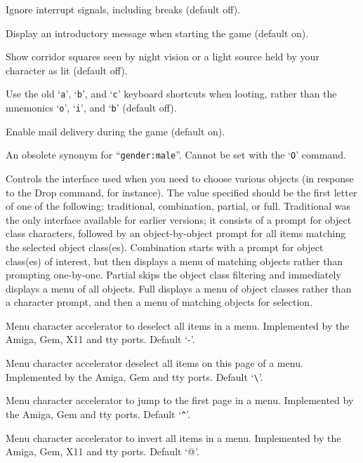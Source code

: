 \item[\ib{ignintr}]
Ignore interrupt signals, including breaks (default off).
\item[\ib{legacy}]
Display an introductory message when starting the game (default on).
\item[\ib{lit\_corridor}]
Show corridor squares seen by night vision or a light source held by your
character as lit (default off).
\item[\ib{lootabc}]
Use the old `{\tt a}', `{\tt b}', and `{\tt c}' keyboard shortcuts when
looting, rather than the mnemonics `{\tt o}', `{\tt i}', and `{\tt b}' (default off).
\item[\ib{mail}]
Enable mail delivery during the game (default on).
\item[\ib{male}]
An obsolete synonym for ``{\tt gender:male}''.  Cannot be set with the
`{\tt O}' command.
\item[\ib{menustyle}]
Controls the interface used when you need to choose various objects (in
response to the Drop command, for instance).  The value specified should
be the first letter of one of the following:  traditional, combination,
partial, or full.  Traditional was the only interface available for
earlier versions; it consists of a prompt for object class characters,
followed by an object-by-object prompt for all items matching the selected
object class(es).  Combination starts with a prompt for object class(es)
of interest, but then displays a menu of matching objects rather than
prompting one-by-one.  Partial skips the object class filtering and
immediately displays a menu of all objects.  Full displays a menu of
object classes rather than a character prompt, and then a menu of matching
objects for selection.
\item[\ib{menu\_deselect\_all}]
Menu character accelerator to deselect all items in a menu.
Implemented by the Amiga, Gem, X11 and tty ports.
Default `-'.
\item[\ib{menu\_deselect\_page}]
Menu character accelerator deselect all items on this page of a menu.
Implemented by the Amiga, Gem and tty ports.
Default `\verb+\+'.
\item[\ib{menu\_first\_page}]
Menu character accelerator to jump to the first page in a menu.
Implemented by the Amiga, Gem and tty ports.
Default `\verb+^+'.
\item[\ib{menu\_invert\_all}]
Menu character accelerator to invert all items in a menu.
Implemented by the Amiga, Gem, X11 and tty ports.
Default `@'.
\item[\ib{menu\_invert\_page}]
